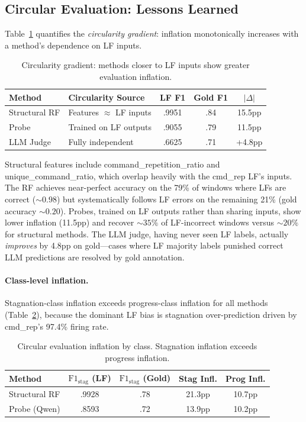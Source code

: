 \documentclass[11pt]{article}
\begin{document}
\subsection{Circular Evaluation: Lessons Learned}
\label{sec:circular}

Table~\ref{tab:circularity} quantifies the \emph{circularity gradient}: inflation monotonically increases with a method's dependence on LF inputs.

\begin{table}[t]
\centering
\caption{Circularity gradient: methods closer to LF inputs show greater evaluation inflation.}
\label{tab:circularity}
\small
\begin{tabular}{llccc}
\toprule
\textbf{Method} & \textbf{Circularity Source} & \textbf{LF F1} & \textbf{Gold F1} & $|\Delta|$ \\
\midrule
Structural RF & Features $\approx$ LF inputs & .9951 & .84 & 15.5pp \\
Probe & Trained on LF outputs & .9055 & .79 & 11.5pp \\
LLM Judge & Fully independent & .6625 & .71 & +4.8pp \\
\bottomrule
\end{tabular}
\end{table}

Structural features include command\_repetition\_ratio and unique\_command\_ratio, which overlap heavily with the cmd\_rep LF's inputs.
The RF achieves near-perfect accuracy on the 79\% of windows where LFs are correct (${\sim}0.98$) but systematically follows LF errors on the remaining 21\% (gold accuracy ${\sim}0.20$).
Probes, trained on LF outputs rather than sharing inputs, show lower inflation (11.5pp) and recover ${\sim}35\%$ of LF-incorrect windows versus ${\sim}20\%$ for structural methods.
The LLM judge, having never seen LF labels, actually \emph{improves} by 4.8pp on gold---cases where LF majority labels punished correct LLM predictions are resolved by gold annotation.

\paragraph{Class-level inflation.} Stagnation-class inflation exceeds progress-class inflation for all methods (Table~\ref{tab:class_inflation}), because the dominant LF bias is stagnation over-prediction driven by cmd\_rep's 97.4\% firing rate.

\begin{table}[t]
\centering
\caption{Circular evaluation inflation by class. Stagnation inflation exceeds progress inflation.}
\label{tab:class_inflation}
\small
\begin{tabular}{lcccc}
\toprule
\textbf{Method} & \textbf{$\text{F1}_\text{stag}$ (LF)} & \textbf{$\text{F1}_\text{stag}$ (Gold)} & \textbf{Stag Infl.} & \textbf{Prog Infl.} \\
\midrule
Structural RF & .9928 & .78 & 21.3pp & 10.7pp \\
Probe (Qwen)  & .8593 & .72 & 13.9pp & 10.2pp \\
\bottomrule
\end{tabular}
\end{table}
\end{document}
